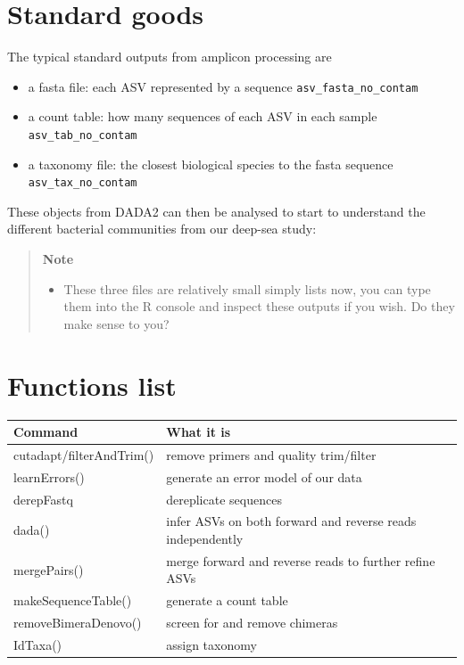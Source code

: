 \documentclass[
]{book}
\providecommand{\tightlist}{%
  \setlength{\itemsep}{0pt}\setlength{\parskip}{0pt}}
\begin{document}
\hypertarget{standard-goods}{%
\section{Standard goods}\label{standard-goods}}

The typical standard outputs from amplicon processing are

\begin{itemize}
\item
  a fasta file: each ASV represented by a sequence \texttt{asv\_fasta\_no\_contam}
\item
  a count table: how many sequences of each ASV in each sample \texttt{asv\_tab\_no\_contam}
\item
  a taxonomy file: the closest biological species to the fasta sequence \texttt{asv\_tax\_no\_contam}
\end{itemize}

These objects from DADA2 can then be analysed to start to understand the different bacterial communities from our deep-sea study:

\begin{quote}
\textbf{Note}

\begin{itemize}
\tightlist
\item
  These three files are relatively small simply lists now, you can type them into the R console and inspect these outputs if you wish. Do they make sense to you?
\end{itemize}
\end{quote}

\hypertarget{functions-list}{%
\section{Functions list}\label{functions-list}}

\begin{longtable}{ll}
\toprule
\textbf{Command} & \textbf{What it is}\\
\midrule
cutadapt/filterAndTrim() & remove primers and quality trim/filter\\
learnErrors() & generate an error model of our data\\
derepFastq & dereplicate sequences\\
dada() & infer ASVs on both forward and reverse reads independently\\
mergePairs() & merge forward and reverse reads to further refine ASVs\\
\addlinespace
makeSequenceTable() & generate a count table\\
removeBimeraDenovo() & screen for and remove chimeras\\
IdTaxa() & assign taxonomy\\
\bottomrule
\end{longtable}
\end{document}
